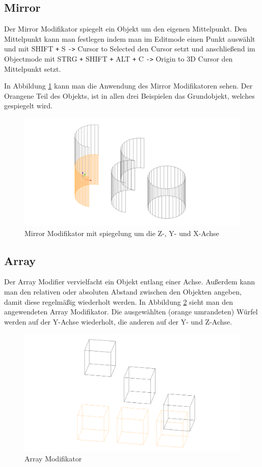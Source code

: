 \subsection{Mirror}
\citep{blender:mirror_modifier} Der Mirror Modifikator spiegelt ein Objekt um den eigenen Mittelpunkt.
Den Mittelpunkt kann man festlegen indem man im Editmode einen Punkt auswählt
und mit SHIFT \verb-+- S \verb+->+ Cursor to Selected den Cursor setzt und anschließend im Objectmode mit STRG \verb-+- SHIFT \verb-+- ALT \verb-+- C \verb+->+
Origin to 3D Cursor den Mittelpunkt setzt.

In Abbildung \ref{modifikatoren:image2} kann man die Anwendung des Mirror Modifikatoren sehen. Der Orangene Teil des Objekts, ist in allen drei Beispielen das
Grundobjekt, welches gespiegelt wird.

\begin{figure}[h]
    \centering
    \includegraphics[width=.8\textwidth]{images/Modifikatoren-Mirror.png}
    \caption{Mirror Modifikator mit spiegelung um die Z-, Y- und X-Achse}
    \label{modifikatoren:image2}
\end{figure}

\subsection{Array}
\citep{blender:array_modifier} Der Array Modifier vervielfacht ein Objekt entlang einer Achse. Außerdem kann man den relativen oder absoluten Abstand zwischen den Objekten
angeben, damit diese regelmäßig wiederholt werden. In Abbildung \ref{modifikatoren:image3} sieht man den angewendeten Array Modifikator. Die ausgewählten (orange umrandeten) Würfel werden auf der Y-Achse
wiederholt, die anderen auf der Y- und Z-Achse.
\begin{figure}[h]
    \centering
    \includegraphics[width=.8\textwidth]{images/Modifikatoren-Array.png}
    \caption{Array Modifikator}
    \label{modifikatoren:image3}
\end{figure}

